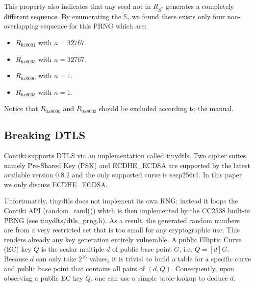 This property also indicates that any seed not in $R_{S^*}$ generates a completely different sequence. By enumerating the $\mathbb{S}$, we found there exists only four non-overlapping sequence for this PRNG which are:
\begin{itemize}
	\item $R_{0x0001}$ with $n = 32767$.
	\item $R_{0x0003}$ with $n = 32767$.
	\item $R_{0x0000}$ with $n = 1$.
	\item $R_{0x8003}$ with $n = 1$.
\end{itemize}
Notice that $R_{0x0000}$ and $R_{0x8003}$ should be excluded according to the manual\cite{CC2538Manual}. 

\subsection{Breaking DTLS} \label{BreakDTLS}
Contiki supports DTLS via an implementation called tinydtls\cite{tinydtls}.  Two cipher suites, namely Pre-Shared Key\cite{rfc4279} (PSK) and ECDHE\_ECDSA\cite{rfc4492} are supported by the latest available version 0.8.2\cite{tinydtls082} and the only supported curve is secp256r1\cite{secp256r1}. In this paper we only discuss ECDHE\_ECDSA. 


Unfortunately, tinydtls does not implement its own RNG; instead it loops the Contiki  API (random\_rand()) which is then implemented by the CC2538 built-in PRNG (see tinydlts/dtls\_prng.h). As a result, the generated random numbers are from a very restricted set that is too small for any cryptographic use. This renders already any key generation entirely vulnerable. A public Elliptic Curve (EC) key $Q$ is the scalar multiple $d$ of public base point $G$, i.e. $Q=[d]G$. Because $d$ can only take $2^{16}$ values, it is trivial to build a table for a specific curve and public base point that contains all pairs of $(d,Q)$. Consequently, upon observing a public EC key $Q$, one can use a simple table-lookup to deduce $d$.


